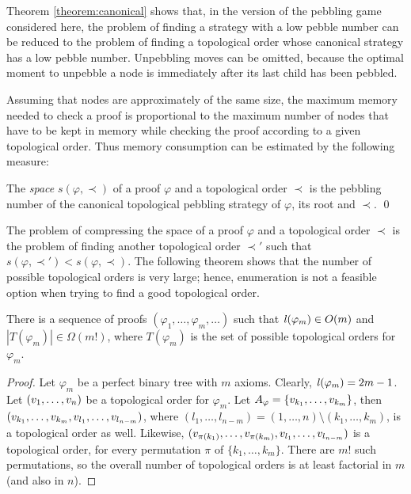 \documentclass{llncs}
\newcommand{\Axioms}[1]{A_{#1}}
\begin{document}
\noindent
Theorem \ref{theorem:canonical} shows that, in the version of the pebbling game considered here, the problem of finding a strategy with a low pebble number can be reduced to the problem of finding a topological order whose canonical strategy has a low pebble number. Unpebbling moves can be omitted, because the optimal moment to unpebble a node is immediately after its last child has been pebbled.

Assuming that nodes are approximately of the same size, the maximum memory needed to check a proof is proportional to the maximum number of nodes that have to be kept in memory while checking the proof according to a given topological order. Thus memory consumption can be estimated by the following measure:

\newcommand{\pspace}[2]{s(#1,#2)}
\begin{definition}[Space]
\label{def:space measure}
The \emph{space} $\pspace{\varphi}{\prec}$ 
of a proof $\varphi$ and a topological order $\prec$ is the pebbling number of the canonical topological pebbling strategy of $\varphi$, its root and $\prec$.
\qed
\end{definition}

\noindent
The problem of compressing the space of a proof $\varphi$ and a topological order $\prec$ is the problem of finding another topological order $\prec'$ such that $\pspace{\varphi}{\prec'} < \pspace{\varphi}{\prec}$. The following theorem shows that the number of possible topological orders is very large; hence, enumeration is not a feasible option when trying to find a good topological order.

\begin{theorem}
\label{theorem:enumeration}
There is a sequence of proofs $(\varphi_1,\ldots,\varphi_m,\ldots)$ such that $\mathit{l}(\varphi_m) \in O(m)$ and $|T(\varphi_m)| \in \Omega(m!)$, where $T(\varphi_m)$ is the set of possible topological orders for $\varphi_m$.
\end{theorem}
\begin{proof}
Let $\varphi_m$ be a perfect binary tree with $m$ axioms. Clearly, $\mathit{l}(\varphi_m) = 2m-1$.
Let $(v_1,\ldots,v_n)$ be a topological order for $\varphi_m$. 
Let $\Axioms{\varphi} = \{\n_{k_1},\ldots,\n_{k_m}\}$, then $(v_{k_1},\ldots,v_{k_m},v_{l_1},\ldots,v_{l_{n-m}})$, where $(l_1,\ldots,l_{n-m}) = (1,\ldots,n) \setminus (k_1,\ldots,k_m)$, is a topological order as well. 
Likewise, $(v_{\pi({k_1})},\ldots,v_{\pi({k_m})},v_{l_1},\ldots,v_{l_{n-m}})$ is a topological order, for every permutation $\pi$ of $\{k_1,\ldots,k_m\}$. There are $m!$ such permutations, so the overall number of topological orders is at least factorial in $m$ (and also in $n$).
\end{proof}
\end{document}
